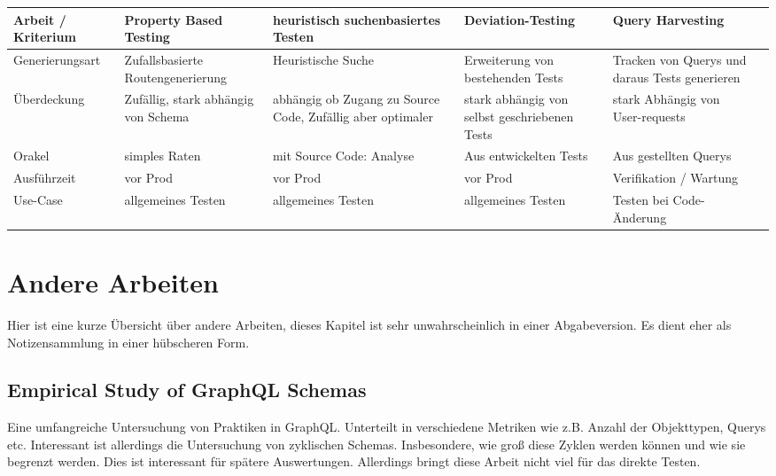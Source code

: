 \begin{center}
    \begin{table}[!hbt]
        \begin{tabularx}{\textwidth}{|C|C|C|C|C|C|}
            \hline
            \textbf{ Arbeit / Kriterium} & \textbf{Property Based Testing} & \textbf{heuristisch suchenbasiertes Testen} & \textbf{Deviation-Testing} & \textbf{Query Harvesting} \\
            \hline
            Generierungsart & Zufallsbasierte Routengenerierung & Heuristische Suche & Erweiterung von bestehenden Tests & Tracken von Querys und daraus Tests generieren \\
            \hline
            Überdeckung & Zufällig, stark abhängig von Schema  & abhängig ob Zugang zu Source Code, Zufällig aber optimaler & stark abhängig von selbst geschriebenen Tests  & stark Abhängig von User-requests  \\
            \hline
            Orakel & simples Raten & mit Source Code: Analyse & Aus entwickelten Tests &  Aus gestellten Querys \\
            \hline
            Ausführzeit & vor Prod & vor Prod & vor Prod & Verifikation / Wartung \\
            \hline
            Use-Case & allgemeines Testen & allgemeines Testen & allgemeines Testen & Testen bei Code-Änderung \\
            \hline
        \end{tabularx}
    \end{table}
\end{center}

\section{Andere Arbeiten}
Hier ist eine kurze Übersicht über andere Arbeiten, dieses Kapitel ist sehr unwahrscheinlich in einer Abgabeversion.
Es dient eher als Notizensammlung in einer hübscheren Form.

\subsection{Empirical Study of GraphQL Schemas}
Eine umfangreiche Untersuchung von Praktiken in GraphQL. Unterteilt in verschiedene Metriken wie z.B.
Anzahl der Objekttypen, Querys etc.
Interessant ist allerdings die Untersuchung von zyklischen Schemas. Insbesondere, wie groß diese Zyklen
werden können und wie sie begrenzt werden. Dies ist interessant für spätere Auswertungen. Allerdings bringt
diese Arbeit nicht viel für das direkte Testen.

